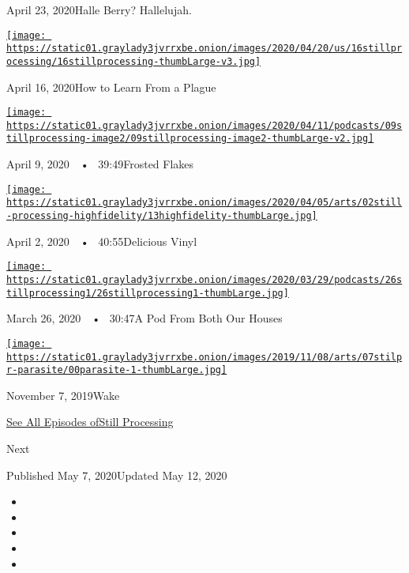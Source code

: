 April 23, 2020Halle Berry? Hallelujah.

\href{https://www.nytimes3xbfgragh.onion/2020/04/16/podcasts/still-processing-AIDS-survive-coronavirus.html?action=click\&module=audio-series-bar\&region=header\&pgtype=Article}{\texttt{[image: https://static01.graylady3jvrrxbe.onion/images/2020/04/20/us/16stillprocessing/16stillprocessing-thumbLarge-v3.jpg]}}

April 16, 2020How to Learn From a Plague

\href{https://www.nytimes3xbfgragh.onion/2020/04/09/podcasts/still-processing-tiger-king.html?action=click\&module=audio-series-bar\&region=header\&pgtype=Article}{\texttt{[image: https://static01.graylady3jvrrxbe.onion/images/2020/04/11/podcasts/09stillprocessing-image2/09stillprocessing-image2-thumbLarge-v2.jpg]}}

April 9, 2020~~•~ 39:49Frosted Flakes

\href{https://www.nytimes3xbfgragh.onion/2020/04/02/podcasts/high-fidelity-zoe-kravitz.html?action=click\&module=audio-series-bar\&region=header\&pgtype=Article}{\texttt{[image: https://static01.graylady3jvrrxbe.onion/images/2020/04/05/arts/02still-processing-highfidelity/13highfidelity-thumbLarge.jpg]}}

April 2, 2020~~•~ 40:55Delicious Vinyl

\href{https://www.nytimes3xbfgragh.onion/2020/03/26/podcasts/still-processing-quarantine.html?action=click\&module=audio-series-bar\&region=header\&pgtype=Article}{\texttt{[image: https://static01.graylady3jvrrxbe.onion/images/2020/03/29/podcasts/26stillprocessing1/26stillprocessing1-thumbLarge.jpg]}}

March 26, 2020~~•~ 30:47A Pod From Both Our Houses

\href{https://www.nytimes3xbfgragh.onion/2019/11/07/podcasts/still-processing-parasite-watchmen-bong-joon-ho.html?action=click\&module=audio-series-bar\&region=header\&pgtype=Article}{\texttt{[image: https://static01.graylady3jvrrxbe.onion/images/2019/11/08/arts/07stilpr-parasite/00parasite-1-thumbLarge.jpg]}}

November 7, 2019Wake

\href{https://www.nytimes3xbfgragh.onion/column/still-processing-podcast}{See
All Episodes ofStill Processing}

Next

Published May 7, 2020Updated May 12, 2020

\begin{itemize}
\item
\item
\item
\item
\item
\end{itemize}

